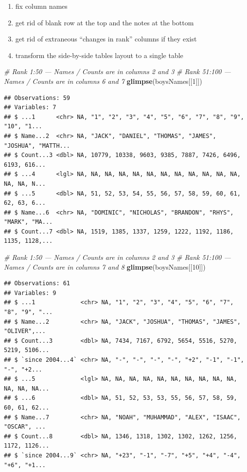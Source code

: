 \documentclass[]{book}
\newenvironment{Shaded}{\begin{snugshade}}{\end{snugshade}}
\newcommand{\CommentTok}[1]{\textcolor[rgb]{0.56,0.35,0.01}{\textit{#1}}}
\newcommand{\DecValTok}[1]{\textcolor[rgb]{0.00,0.00,0.81}{#1}}
\newcommand{\KeywordTok}[1]{\textcolor[rgb]{0.13,0.29,0.53}{\textbf{#1}}}
\newcommand{\NormalTok}[1]{#1}
\providecommand{\tightlist}{%
  \setlength{\itemsep}{0pt}\setlength{\parskip}{0pt}}
\begin{document}
\begin{enumerate}
\def\labelenumi{\arabic{enumi}.}
\tightlist
\item
  fix column names
\item
  get rid of blank row at the top and the notes at the bottom
\item
  get rid of extraneous ``changes in rank'' columns if they exist
\item
  transform the side-by-side tables layout to a single table
\end{enumerate}

\begin{Shaded}
\begin{Highlighting}[]
\CommentTok{# Rank 1:50 --- Names / Counts are in columns 2 and 3 }
\CommentTok{# Rank 51:100 --- Names / Counts are in columns 6 and 7}
\KeywordTok{glimpse}\NormalTok{(boysNames[[}\DecValTok{1}\NormalTok{]]) }
\end{Highlighting}
\end{Shaded}

\begin{verbatim}
## Observations: 59
## Variables: 7
## $ ...1      <chr> NA, "1", "2", "3", "4", "5", "6", "7", "8", "9", "10", "1...
## $ Name...2  <chr> NA, "JACK", "DANIEL", "THOMAS", "JAMES", "JOSHUA", "MATTH...
## $ Count...3 <dbl> NA, 10779, 10338, 9603, 9385, 7887, 7426, 6496, 6193, 616...
## $ ...4      <lgl> NA, NA, NA, NA, NA, NA, NA, NA, NA, NA, NA, NA, NA, NA, N...
## $ ...5      <dbl> NA, 51, 52, 53, 54, 55, 56, 57, 58, 59, 60, 61, 62, 63, 6...
## $ Name...6  <chr> NA, "DOMINIC", "NICHOLAS", "BRANDON", "RHYS", "MARK", "MA...
## $ Count...7 <dbl> NA, 1519, 1385, 1337, 1259, 1222, 1192, 1186, 1135, 1128,...
\end{verbatim}

\begin{Shaded}
\begin{Highlighting}[]
\CommentTok{# Rank 1:50 --- Names / Counts are in columns 2 and 3 }
\CommentTok{# Rank 51:100 --- Names / Counts are in columns 7 and 8}
\KeywordTok{glimpse}\NormalTok{(boysNames[[}\DecValTok{10}\NormalTok{]]) }
\end{Highlighting}
\end{Shaded}

\begin{verbatim}
## Observations: 61
## Variables: 9
## $ ...1             <chr> NA, "1", "2", "3", "4", "5", "6", "7", "8", "9", "...
## $ Name...2         <chr> NA, "JACK", "JOSHUA", "THOMAS", "JAMES", "OLIVER",...
## $ Count...3        <dbl> NA, 7434, 7167, 6792, 5654, 5516, 5270, 5219, 5106...
## $ `since 2004...4` <chr> NA, "-", "-", "-", "-", "+2", "-1", "-1", "-", "+2...
## $ ...5             <lgl> NA, NA, NA, NA, NA, NA, NA, NA, NA, NA, NA, NA, NA...
## $ ...6             <dbl> NA, 51, 52, 53, 53, 55, 56, 57, 58, 59, 60, 61, 62...
## $ Name...7         <chr> NA, "NOAH", "MUHAMMAD", "ALEX", "ISAAC", "OSCAR", ...
## $ Count...8        <dbl> NA, 1346, 1318, 1302, 1302, 1262, 1256, 1172, 1126...
## $ `since 2004...9` <chr> NA, "+23", "-1", "-7", "+5", "+4", "-4", "+6", "+1...
\end{verbatim}
\end{document}
